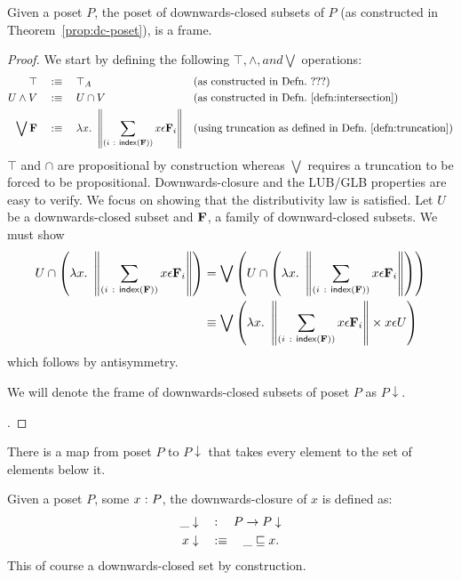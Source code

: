 \begin{thm}\label{thm:down-set-frame}
  Given a poset $P$, the poset of downwards-closed subsets of $P$ (as constructed in
  Theorem~\ref{prop:dc-poset}), is a frame.
\end{thm}
\begin{proof}
  We start by defining the following $\top, \wedge, and \bigvee$ operations:
  \begin{align*}
    \top       \quad&:\equiv\quad \top_A   && \text{(as constructed in Defn.~???)} \\
    U \wedge V   \quad&:\equiv\quad U \cap V && \text{(as constructed in Defn.~\ref{defn:intersection})}\\
    \bigvee \mathbf{F}{} \quad&:\equiv\quad \lambda x.~ \left\| \sum_{(i~:~\mathsf{index}{}\left(\mathbf{F}{}\right))} x \epsilon \mathbf{F}{}_i \right\|
                         && \text{(using truncation as defined in Defn.~\ref{defn:truncation})}
  \end{align*}
  $\top$ and $\cap$ are propositional by construction whereas $\bigvee$ requires a truncation to be
  forced to be propositional. Downwards-closure and the LUB/GLB properties are easy to
  verify. We focus on showing that the distributivity law is satisfied. Let $U$ be a
  downwards-closed subset and $\mathbf{F}{}$, a family of downward-closed subsets. We must show
  \begin{align*}
    U \cap \left(\lambda x.~ \left\| \sum_{(i~:~\mathsf{index}{}\left(\mathbf{F}{}\right))} x \epsilon \mathbf{F}{}_i \right\|\right)
      &= \bigvee \left( U \cap \left( \lambda x.~ \left\| \sum_{(i~:~\mathsf{index}{}\left(\mathbf{F}{}\right))} x \epsilon \mathbf{F}{}_i \right\|\right) \right)\\
      &\equiv \bigvee \left( \lambda x.~ \left\| \sum_{(i~:~\mathsf{index}{}\left(\mathbf{F}{}\right))} x \epsilon \mathbf{F}{}_i \right\| \times x \epsilon U \right)
  \end{align*}
  which follows by antisymmetry.

  We will denote the frame of downwards-closed subsets of poset $P$ as $P\downarrow$.

  .
\end{proof}

There is a map from poset $P$ to $P\downarrow$ that takes every element to the set of elements
below it.

\begin{defn}\label{defn:down-clos}
  Given a poset $P$, some $x\hspace{0.1mm}:\hspace{0.1mm}P$, the downwards-closure of $x$ is defined as:
  \begin{align*}
    \_\downarrow \quad&:\quad P \rightarrow P\downarrow                   \\
    x\downarrow  \quad&:\equiv\quad \_ \sqsubseteq x  .
  \end{align*}
  This of course a downwards-closed set by construction.
\end{defn}

